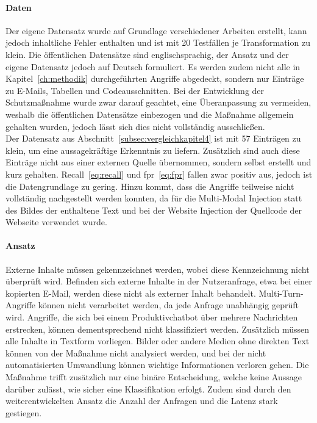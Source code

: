 \paragraph{Daten}
Der eigene Datensatz wurde auf Grundlage verschiedener Arbeiten erstellt, kann jedoch inhaltliche Fehler enthalten und ist mit 20 Testfällen je Transformation zu klein.
Die öffentlichen Datensätze sind englischsprachig, der Ansatz und der eigene Datensatz jedoch auf Deutsch formuliert. Es werden zudem nicht alle in 
Kapitel~\ref{ch:methodik} durchgeführten Angriffe abgedeckt, sondern nur Einträge zu E-Mails, Tabellen und Codeausschnitten. Bei der Entwicklung der Schutzmaßnahme 
wurde zwar darauf geachtet, eine Überanpassung zu vermeiden, weshalb die öffentlichen Datensätze einbezogen
und die Maßnahme allgemein gehalten wurden, jedoch lässt sich dies nicht vollständig ausschließen. \\
Der Datensatz aus Abschnitt~\ref{subsec:vergleichkapitel4} ist mit 57 Einträgen zu klein, um eine aussagekräftige Erkenntnis zu liefern. Zusätzlich
sind auch diese Einträge nicht aus einer externen Quelle übernommen, sondern selbst erstellt und kurz gehalten. Recall~\eqref{eq:recall} und \ac{fpr}~\eqref{eq:fpr} 
fallen zwar positiv aus, jedoch ist die Datengrundlage zu gering. 
Hinzu kommt, dass die Angriffe teilweise nicht vollständig nachgestellt werden konnten, da für die Multi-Modal Injection statt des Bildes der 
enthaltene Text und bei der Website Injection der Quellcode der Webseite verwendet wurde.

\paragraph{Ansatz}
Externe Inhalte müssen gekennzeichnet werden, wobei diese Kennzeichnung nicht überprüft wird. Befinden sich externe Inhalte in
der Nutzeranfrage, etwa bei einer kopierten E-Mail, werden diese nicht als externer Inhalt behandelt. Multi-Turn-Angriffe können nicht verarbeitet werden, da jede 
Anfrage unabhängig geprüft wird. Angriffe, die sich bei einem Produktivchatbot über mehrere Nachrichten erstrecken, können dementsprechend nicht klassifiziert werden.
Zusätzlich müssen alle Inhalte in Textform vorliegen. Bilder oder andere Medien ohne direkten Text können von der Maßnahme nicht analysiert werden, und bei der 
nicht automatisierten Umwandlung können wichtige Informationen verloren gehen. Die Maßnahme trifft zusätzlich nur eine binäre Entscheidung, welche keine
Aussage darüber zulässt, wie sicher eine Klassifikation erfolgt. Zudem sind durch den weiterentwickelten Ansatz die Anzahl der Anfragen und die Latenz stark gestiegen.

